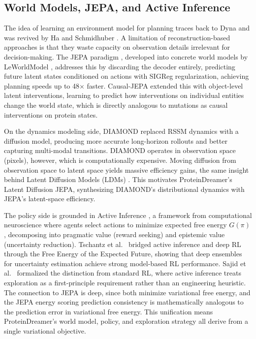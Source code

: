 \documentclass[12pt, a4paper]{article}
\begin{document}
\subsection{World Models, JEPA, and Active Inference}

The idea of learning an environment model for planning traces back to Dyna \citep{sutton1991dyna} and was revived by Ha and Schmidhuber \citep{ha2018worldmodels}. A limitation of reconstruction-based approaches is that they waste capacity on observation details irrelevant for decision-making. The JEPA paradigm \citep{lecun2022path}, developed into concrete world models by LeWorldModel \citep{maes2026leworldmodel}, addresses this by discarding the decoder entirely, predicting future latent states conditioned on actions with SIGReg regularization, achieving planning speeds up to 48$\times$ faster. Causal-JEPA \citep{nam2026causaljepa} extended this with object-level latent interventions, learning to predict how interventions on individual entities change the world state, which is directly analogous to mutations as causal interventions on protein states.

On the dynamics modeling side, DIAMOND \citep{alonso2024diamond} replaced RSSM dynamics with a diffusion model, producing more accurate long-horizon rollouts and better capturing multi-modal transitions. DIAMOND operates in observation space (pixels), however, which is computationally expensive. Moving diffusion from observation space to latent space yields massive efficiency gains, the same insight behind Latent Diffusion Models (LDMs) \citep{rombach2022ldm}. This motivates ProteinDreamer's Latent Diffusion JEPA, synthesizing DIAMOND's distributional dynamics with JEPA's latent-space efficiency.

The policy side is grounded in Active Inference \citep{parr2022active}, a framework from computational neuroscience where agents select actions to minimize expected free energy $G(\pi)$, decomposing into pragmatic value (reward seeking) and epistemic value (uncertainty reduction). Tschantz et al.\ \citep{tschantz2020rl_active_inference} bridged active inference and deep RL through the Free Energy of the Expected Future, showing that deep ensembles for uncertainty estimation achieve strong model-based RL performance. Sajid et al.\ \citep{sajid2021demystified} formalized the distinction from standard RL, where active inference treats exploration as a first-principle requirement rather than an engineering heuristic. The connection to JEPA is deep, since both minimize variational free energy, and the JEPA energy scoring prediction consistency is mathematically analogous to the prediction error in variational free energy. This unification means ProteinDreamer's world model, policy, and exploration strategy all derive from a single variational objective.
\end{document}
